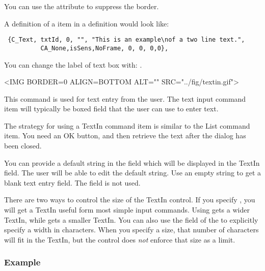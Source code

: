 You can use the  attribute to suppress the border.

A definition of a  item in a 
definition would look like:

\footnotesize
\begin{verbatim}
 {C_Text, txtId, 0, "", "This is an example\nof a two line text.",
          CA_None,isSens,NoFrame, 0, 0, 0,0}, 
\end{verbatim}
\normalfont\normalsize

You can change the label of text box with:
  .


\small
\begin{rawhtml}
<IMG BORDER=0 ALIGN=BOTTOM ALT="" SRC="../fig/textin.gif">
\end{rawhtml}
\begin{latexonly}

\end{latexonly}
\normalfont\normalsize
\vspace{.1in}

This command is used for text entry from the
user. The text input command item will typically be boxed
field that the user can use to enter text.

The strategy for using a TextIn command item is similar to
the List command item. You need an OK button, and then
retrieve the text after the dialog has been closed.

You can provide a default string in the  field
which will be displayed in the TextIn field.  The user will
be able to edit the default string. Use an empty string
to get a blank text entry field. The  field is
not used.

There are two ways to control the size of the TextIn control.
If you specify , you will get a TextIn
useful form most simple input commands. Using 
gets a wider TextIn, while  gets a smaller
TextIn. You can also use the  field of the
 to explicitly specify a width in
characters. When you specify a size, that number of
characters will fit in the TextIn, but the control
does \emph{not} enforce that size as a limit.

\subsubsection* {Example}

